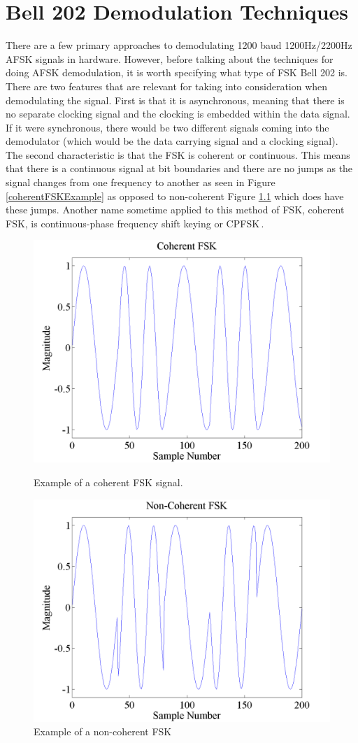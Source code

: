 \chapter{Bell 202 Demodulation Techniques}
There are a few primary approaches to demodulating 1200 baud 1200Hz/2200Hz AFSK signals in hardware.  However, before talking about the techniques for doing AFSK demodulation, it is worth specifying what type of FSK Bell 202 is. There are two features that are relevant for taking into consideration when demodulating the signal. First is that it is asynchronous, meaning that there is no separate clocking signal and the clocking is embedded within the data signal. If it were synchronous, there would be two different signals coming into the demodulator (which would be the data carrying signal and a clocking signal). The second characteristic is that the FSK is coherent or continuous. This means that there is a continuous signal at bit boundaries and there are no jumps as the signal changes from one frequency to another as seen in Figure \ref{coherentFSKExample} as opposed to non-coherent Figure \ref{noncoherentFSKExample} which does have these jumps. Another name sometime applied to this method of FSK, coherent FSK, is continuous-phase frequency shift keying or CPFSK\,\cite{WikipediaCPFSK}.

\begin{figure}
	\centering
	\includegraphics[width=0.75\linewidth]{images/CoherentFSK.png} 
	\caption{Example of a coherent FSK signal.}
	\label{coherentFSKExample}
	\vspace{15mm}
	\includegraphics[width=0.75\linewidth]{images/NonCoherentFSK.png} 
	\caption{Example of a non-coherent FSK }
	\label{noncoherentFSKExample}
\end{figure}

